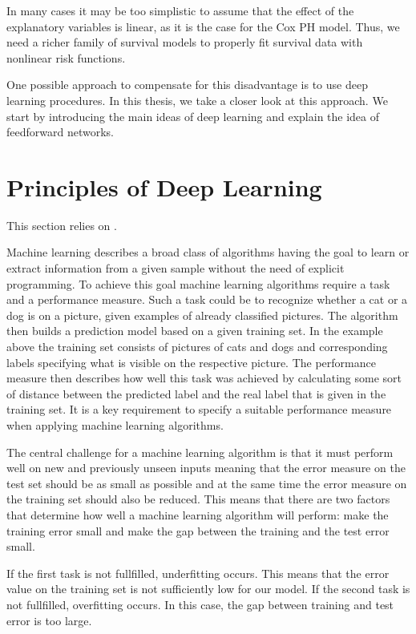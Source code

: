 \documentclass[12pt, a4paper]{scrartcl}
\theoremstyle{definition}
\theoremstyle{plain}
\numberwithin{equation}{section}
\numberwithin{figure}{section}
\numberwithin{table}{section}
\begin{document}
	In many cases it may be too simplistic to assume that the effect of the explanatory variables is linear, as it is the case for the Cox PH model.
	Thus, we need a richer family of survival models to properly fit survival data with nonlinear risk functions.
	
	One possible approach to compensate for this disadvantage is to use deep learning procedures.
	In this thesis, we take a closer look at this approach.
	We start by introducing the main ideas of deep learning and explain the idea of feedforward networks.
	\newpage
	
	\section{Principles of Deep Learning}\label{basicsdl}
	This section relies on \citet*{deeplbook}.
	
	Machine learning describes a broad class of algorithms having the goal to learn or extract information from a given sample without the need of explicit programming.
	To achieve this goal machine learning algorithms require a task and a performance measure.
	Such a task could be to recognize whether a cat or a dog is on a picture, given examples of already classified pictures.
	The algorithm then builds a prediction model based on a given training set.
	In the example above the training set consists of pictures of cats and dogs and corresponding labels specifying what is visible on the respective picture.
	The performance measure then describes how well this task was achieved by calculating some sort of distance between the predicted label and the real label that is given in the training set.
	It is a key requirement to specify a suitable performance measure when applying machine learning algorithms.
	

	The central challenge for a machine learning algorithm is that it must perform well on new and previously unseen inputs meaning that the error measure on the test set should be as small as possible and at the same time the error measure on the training set should also be reduced.
	This means that there are two factors that determine how well a machine learning algorithm will perform:
	make the training error small and make the gap between the training and the test error small.
	
	If the first task is not fullfilled, underfitting occurs. This means that the error value on the training set is not sufficiently low for our model.
	If the second task is not fullfilled, overfitting occurs. In this case, the gap between training and test error is too large.
	
\end{document}
